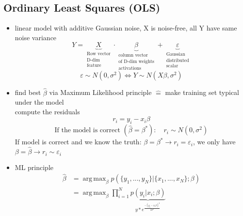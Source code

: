 \documentclass[11pt]{article}
\DeclareMathOperator*{\argmax}{arg\,max}
\begin{document}
\begin{itemize}
    \subsection{Ordinary Least Squares (OLS)}
      \begin{itemize}
        \item linear model with additive Gaussian noise, X is noise-free,
        all Y have same noise variance
        \begin{equation*}
          Y = \underbrace{X}_{\substack{\text{Row vector} \\
          \text{D-dim} \\ \text{feature}}} \cdot \underbrace
          {\beta}_{\substack{\text{column vector} \\
          \text{of D-dim weights} \\ \text{activations}}} +
          \underbrace{\varepsilon}_{\substack{\text{Gaussian} \\
          \text{distributed} \\ \text{scalar}}}
        \end{equation*}
        \begin{equation*}
          \varepsilon \sim N(0, \sigma^2) \iff Y \sim N(X\beta, \sigma^2)
        \end{equation*}
        \item find best $\hat{\beta}$ via Maximum Likelihood principle $\hat{=}$
        make training set typical under the model \\
        compute the residuals
        \begin{equation*}
          r_i = y_i - x_i\beta
        \end{equation*}
        \begin{equation*}
          \text{If the model is correct } (\hat{\beta}=\beta^*):\quad r_i \sim N(0, \sigma^2)
        \end{equation*}
        If model is correct and we know the truth:  $\beta = \beta^* \rightarrow r_i =
        \varepsilon_i$, we only have $\beta = \hat{\beta} \rightarrow r_i \sim \varepsilon_i$
        \item ML principle
        \begin{equation*}
          \begin{align*}
            \hat{\beta}&= \argmax_{\beta} p(\{ y_1,...,y_N\} |\{ x_1,...,x_N\};\beta) \\
            &= \argmax_{\beta} \prod_{i=1}^{N} \underbrace{p(y_i|x_i;\beta)}_{
            y*e^{\frac{-(y_i-x_i\beta)^2}{2\sigma^2}}}

\end{align*}
\end{equation*}
\end{itemize}
\end{itemize}
\end{document}
